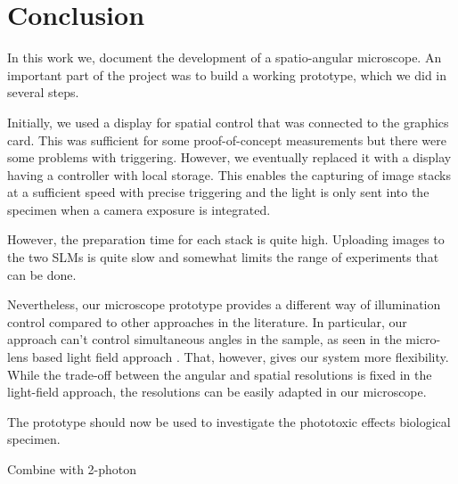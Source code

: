 \chapter{Conclusion}
In this work we, document the development of a spatio-angular
microscope. An important part of the project was to build a working
prototype, which we did in several steps.

Initially, we used a display for spatial control that was connected to
the graphics card. This was sufficient for some proof-of-concept
measurements but there were some problems with triggering. However, we
eventually replaced it with a display having a controller with local
storage. This enables the capturing of image stacks at a sufficient
speed with precise triggering and the light is only sent into the
specimen when a camera exposure is integrated.

However, the preparation time for each stack is quite high.  Uploading
images to the two SLMs is quite slow and somewhat limits the range of
experiments that can be done.

Nevertheless, our microscope prototype provides a different way of
illumination control compared to other approaches in the
literature. In particular, our approach can't control simultaneous
angles in the sample, as seen in the micro-lens based light field
approach \citep{Levoy2009}. That, however, gives our system more
flexibility. While the trade-off between the angular and spatial
resolutions is fixed in the light-field approach, the resolutions can
be easily adapted in our microscope.

The prototype should now be used to investigate the phototoxic effects
biological specimen.





Combine with 2-photon
